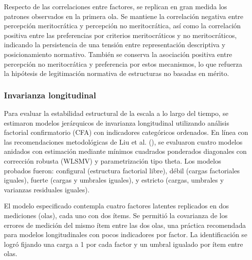 \documentclass[
  12pt,
]{article}
\begin{document}
Respecto de las correlaciones entre factores, se replican en gran medida
los patrones observados en la primera ola. Se mantiene la correlación
negativa entre percepción meritocrática y percepción no meritocrática,
así como la correlación positiva entre las preferencias por criterios
meritocráticos y no meritocráticos, indicando la persistencia de una
tensión entre representación descriptiva y posicionamiento normativo.
También se conserva la asociación positiva entre percepción no
meritocrática y preferencia por estos mecanismos, lo que refuerza la
hipótesis de legitimación normativa de estructuras no basadas en mérito.

\subsubsection{Invarianza longitudinal}\label{invarianza-longitudinal}

Para evaluar la estabilidad estructural de la escala a lo largo del
tiempo, se estimaron modelos jerárquicos de invarianza longitudinal
utilizando análisis factorial confirmatorio (CFA) con indicadores
categóricos ordenados. En línea con las recomendaciones metodológicas de
Liu et al. (), se evaluaron cuatro
modelos anidados con estimación mediante mínimos cuadrados ponderados
diagonales con corrección robusta (WLSMV) y parametrización tipo theta.
Los modelos probados fueron: configural (estructura factorial libre),
débil (cargas factoriales iguales), fuerte (cargas y umbrales iguales),
y estricto (cargas, umbrales y varianzas residuales iguales).

El modelo especificado contempla cuatro factores latentes replicados en
dos mediciones (olas), cada uno con dos ítems. Se permitió la covarianza
de los errores de medición del mismo ítem entre las dos olas, una
práctica recomendada para modelos longitudinales con pocos indicadores
por factor. La identificación se logró fijando una carga a 1 por cada
factor y un umbral igualado por ítem entre olas.

\begingroup\fontsize{9}{11}\selectfont
\end{document}
